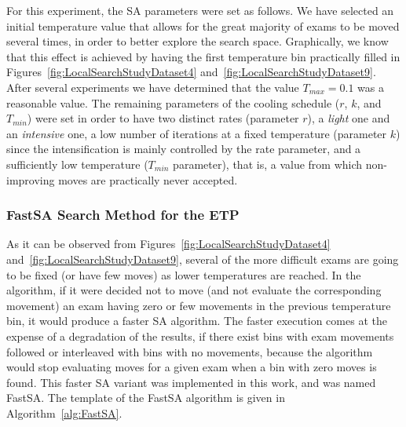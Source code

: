 For this experiment, the SA parameters were set as follows. We have selected an initial temperature value that allows for the great majority of exams to be moved several times, in order to better explore the search space. Graphically, we know that this effect is achieved by having the first temperature bin practically filled in Figures~\ref{fig:LocalSearchStudyDataset4} and~\ref{fig:LocalSearchStudyDataset9}. After several experiments we have determined that the value $T_{max}=0.1$ was a reasonable value. The remaining parameters of the cooling schedule ($r$, $k$, and $T_{min}$) were set in order to have two distinct rates (parameter $r$), a \textit{light} one and an \textit{intensive} one, a low number of iterations at a fixed temperature (parameter $k$) since the intensification is mainly controlled by the rate parameter, and a sufficiently low temperature ($T_{min}$ parameter), that is, a value from which non-improving moves are practically never accepted.





\subsubsection{FastSA Search Method for the ETP}
\label{sec:FastSASearchMethod}

As it can be observed from Figures~\ref{fig:LocalSearchStudyDataset4} and~\ref{fig:LocalSearchStudyDataset9}, several of the more difficult exams are going to be fixed (or have few moves) as lower temperatures are reached. In the algorithm, if it were decided not to move (and not evaluate the corresponding movement) an exam having zero or few movements in the previous temperature bin, it would produce a faster SA algorithm. The faster execution comes at the expense of a degradation of the results, if there exist bins with exam movements followed or interleaved with bins with no movements, because the algorithm would stop evaluating moves for a given exam when a bin with zero moves is found. This faster SA variant was implemented in this work, and was named FastSA. The template of the FastSA algorithm is given in Algorithm~\ref{alg:FastSA}. 

